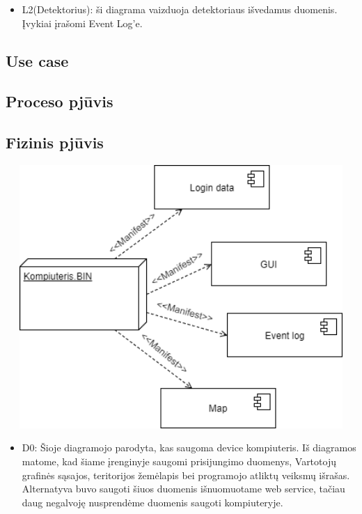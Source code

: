 \documentclass[oneside]{VUMIFPSkursinis}
\begin{document}
\begin{itemize}
		\item L2(Detektorius): ši diagrama vaizduoja detektoriaus išvedamus duomenis. Įvykiai įrašomi Event Log’e.
	\end{itemize}
\pagebreak
		

	
\subsection{Use case}
\subsection{Proceso pjūvis}
\subsection{Fizinis pjūvis}
	\includegraphics[width=15cm,height=10cm]{Deployment.png}
	\begin{itemize}
		\item D0: Šioje diagramojo parodyta, kas saugoma device kompiuteris. 
		Iš diagramos matome, kad šiame įrenginyje saugomi prisijungimo duomenys, Vartotojų grafinės sąsajos, teritorijos žemėlapis bei programojo atliktų veiksmų išrašas. Alternatyva buvo saugoti šiuos duomenis išnuomuotame web service, tačiau daug negalvoję nusprendėme duomenis saugoti kompiuteryje.
	\end{itemize}
\end{document}
